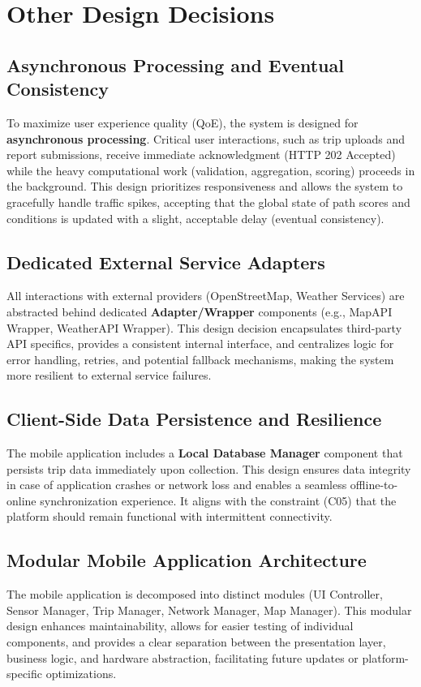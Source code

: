 \section{Other Design Decisions}
\label{sec:other-design-decisions}

\subsection{Asynchronous Processing and Eventual Consistency}
To maximize user experience quality (QoE), the system is designed for \textbf{asynchronous processing}. Critical user interactions, such as trip uploads and report submissions, receive immediate acknowledgment (HTTP 202 Accepted) while the heavy computational work (validation, aggregation, scoring) proceeds in the background. This design prioritizes responsiveness and allows the system to gracefully handle traffic spikes, accepting that the global state of path scores and conditions is updated with a slight, acceptable delay (eventual consistency).

\subsection{Dedicated External Service Adapters}
All interactions with external providers (OpenStreetMap, Weather Services) are abstracted behind dedicated \textbf{Adapter/Wrapper} components (e.g., MapAPI Wrapper, WeatherAPI Wrapper). This design decision encapsulates third-party API specifics, provides a consistent internal interface, and centralizes logic for error handling, retries, and potential fallback mechanisms, making the system more resilient to external service failures.

\subsection{Client-Side Data Persistence and Resilience}
The mobile application includes a \textbf{Local Database Manager} component that persists trip data immediately upon collection. This design ensures data integrity in case of application crashes or network loss and enables a seamless offline-to-online synchronization experience. It aligns with the constraint (C05) that the platform should remain functional with intermittent connectivity.

\subsection{Modular Mobile Application Architecture}
The mobile application is decomposed into distinct modules (UI Controller, Sensor Manager, Trip Manager, Network Manager, Map Manager). This modular design enhances maintainability, allows for easier testing of individual components, and provides a clear separation between the presentation layer, business logic, and hardware abstraction, facilitating future updates or platform-specific optimizations.